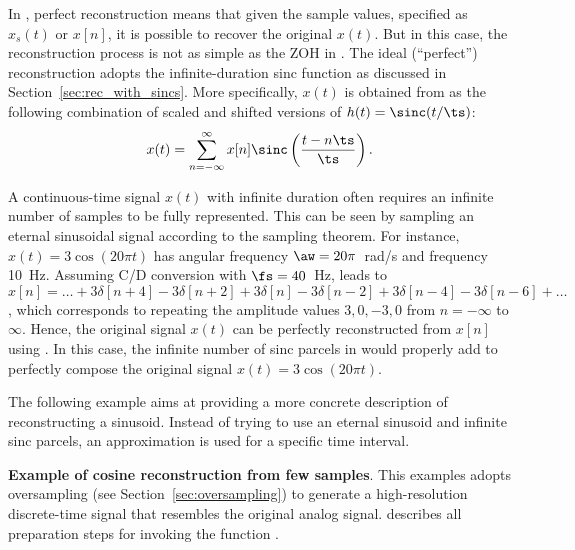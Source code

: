 
In , perfect reconstruction means that given the sample values, specified as $x_s(t)$ or $x[n]$, it is possible to recover the original $x(t)$. But in this case, the reconstruction process is not as simple as the ZOH in . The ideal (``perfect'') reconstruction adopts the infinite-duration sinc function as discussed in Section~\ref{sec:rec_with_sincs}. More specifically, $x(t)$ is obtained from  as the following combination of scaled and shifted versions of $h(t)=\sinc(t / \ts)$:
\begin{equation}
x(t) = \sum_{n=-\infty}^{\infty} x[n] \sinc \left( \frac{t-n \ts}{\ts}\right).
\label{eq:sincInterpolation}
\end{equation}

A continuous-time signal $x(t)$ with infinite duration often requires an infinite number of samples to be fully represented. This can be seen by sampling an eternal sinusoidal signal according to the sampling theorem.
For instance, $x(t)=3 \cos(20 \pi t)$ has angular frequency $\aw=20\pi$~rad/s and frequency 10~Hz. Assuming C/D conversion with $\fs=40$~Hz, leads to $x[n] = \ldots + 3\delta[n+4] -3\delta[n+2] + 3\delta[n] -3\delta[n-2] + 3 \delta[n-4] -3 \delta[n-6] + \ldots$,
which corresponds to repeating the amplitude values $3, 0, -3, 0$ from $n=-\infty$ to $\infty$. 
Hence, the original signal $x(t)$ can be perfectly reconstructed from $x[n]$ using .
In this case, the infinite number of sinc parcels in  would properly add to perfectly compose the original signal $x(t) = 3 \cos(20 \pi t)$.

The following example aims at providing a more concrete description of reconstructing a sinusoid. Instead of trying to use an eternal sinusoid and infinite sinc parcels, an approximation is used for a specific time interval.

\bExample \textbf{Example of cosine reconstruction from few samples}.
This examples adopts oversampling (see Section~\ref{sec:oversampling}) to generate a high-resolution discrete-time signal 
that resembles the original analog signal.
 describes all preparation steps for invoking the
function .

